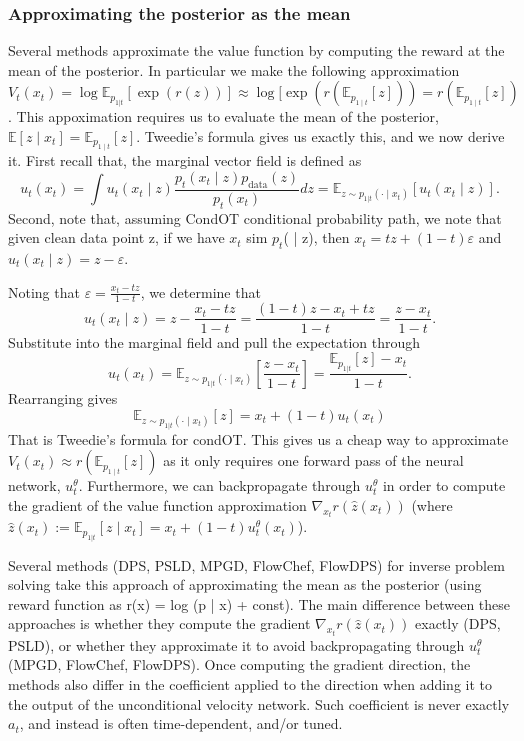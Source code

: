 \documentclass[12pt,a4paper]{report}
\begin{document}
\subsubsection{Approximating the posterior as the mean}
Several methods approximate the value function by computing the reward at the mean of the posterior. 
In particular we make the following approximation 
$$V_t(x_t) = \log \mathbb{E}_{p_{1|t}}[\exp(r(z))]\approx \log [\exp(r(\mathbb{E}_{p_{1 \mid t}}[z])) = r(\mathbb{E}_{p_{1 \mid t}}[z])$$. 
This appoximation requires us to evaluate the mean of the posterior, $\mathbb{E}[z \mid x_t] = \mathbb{E}_{p_{1 \mid t}}[z]$. 
Tweedie's formula gives us exactly this, and we now derive it. First recall that, the marginal vector field is defined as 
$$u_t(x_t) = \int u_t(x_t \mid z) \frac{p_t(x_t \mid z) p_{\text{data}}(z)}{p_t(x_t)} dz = \mathbb{E}_{z \sim p_{1|t}(\cdot \mid x_t)} [u_t(x_t \mid z)].$$
Second, note that, assuming CondOT conditional probability path, we note that given clean data point z, if we have $x_t$ sim $p_t$( | z), then $x_t = tz + (1 - t)\varepsilon$ and $u_t(x_t \mid z) = z - \varepsilon$. 

Noting that $\varepsilon = \frac{x_t - tz}{1 - t}$, we determine that 
\[
u_t(x_t \mid z) = z - \frac{x_t - tz}{1 - t} = \frac{(1 - t)z - x_t + tz}{1 - t} = \frac{z - x_t}{1 - t}.
\]
Substitute into the marginal field and pull the expectation through
\[
u_t(x_t) = \mathbb{E}_{z \sim p_{1|t}(\cdot \mid x_t)} \left[ \frac{z - x_t}{1 - t} \right] = \frac{\mathbb{E}_{p_{1|t}}[z] - x_t}{1 - t}.
\]
Rearranging gives 
\[
\mathbb{E}_{z \sim p_{1|t}(\cdot \mid x_t)}[z] = x_t + (1 - t) u_t(x_t)
\]
That is Tweedie's formula for condOT. This gives us a cheap way to approximate $V_t(x_t) \approx r(\mathbb{E}_{p_{1 \mid t}}[z])$ as it only requires one forward pass of the neural network, $u_t^\theta$. 
Furthermore, we can backpropagate through $u_t^\theta$ in order to compute the gradient of the value function approximation $\nabla_{x_t} r(\hat{z}(x_t))$ (where $\hat{z}(x_t) := \mathbb{E}_{p_{1|t}}[z \mid x_t] = x_t + (1 - t) u_t^\theta(x_t)$). %

Several methods (DPS, PSLD, MPGD, FlowChef, FlowDPS) for inverse problem solving take this approach of approximating the mean as the posterior (using reward function as r(x) = log (p | x) + const). The main difference between these approaches is whether they compute the gradient $\nabla_{x_t} r(\hat{z}(x_t))$ exactly (DPS, PSLD), or whether they approximate it to avoid backpropagating through $u_t^\theta$ (MPGD, FlowChef, FlowDPS). Once computing the gradient direction, the methods also differ in the coefficient applied to the direction when adding it to the output of the unconditional velocity network. Such coefficient is never exactly $a_t$, and instead is often time-dependent, and/or tuned. 
\end{document}
